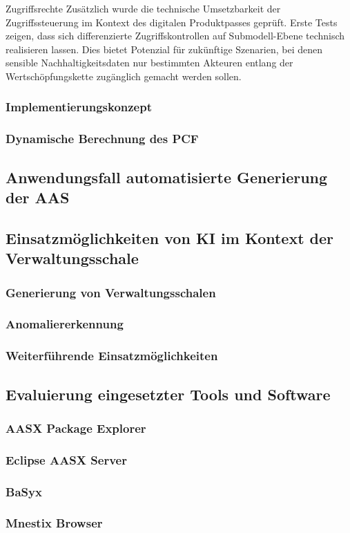 Zugriffsrechte
Zusätzlich wurde die technische Umsetzbarkeit der Zugriffssteuerung im Kontext des digitalen Produktpasses geprüft. Erste Tests zeigen, dass sich differenzierte Zugriffskontrollen auf Submodell-Ebene technisch realisieren lassen. Dies bietet Potenzial für zukünftige Szenarien, bei denen sensible Nachhaltigkeitsdaten nur bestimmten Akteuren entlang der Wertschöpfungskette zugänglich gemacht werden sollen.
\subsubsection{Implementierungskonzept}
\subsubsection{Dynamische Berechnung des PCF}
\subsection{Anwendungsfall automatisierte Generierung der AAS}
\subsection{Einsatzmöglichkeiten von KI im Kontext der Verwaltungsschale}
\subsubsection{Generierung von Verwaltungsschalen}
\subsubsection{Anomaliererkennung}
\subsubsection{Weiterführende Einsatzmöglichkeiten}
\subsection{Evaluierung eingesetzter Tools und Software}
\subsubsection{AASX Package Explorer}
\subsubsection{Eclipse AASX Server}
\subsubsection{BaSyx}
\subsubsection{Mnestix Browser}